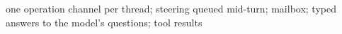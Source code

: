 one operation channel per thread; steering queued mid-turn; mailbox; typed answers to the model's questions; tool results

